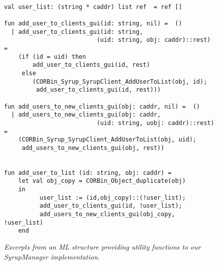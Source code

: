 \begin{figure*}[t]
\singlespace
\begin{verbatim}

val user_list: (string * caddr) list ref  = ref []

fun add_user_to_clients_gui(id: string, nil) =  ()
  | add_user_to_clients_gui(id: string, 
                          (uid: string, obj: caddr)::rest) =
    (if (id = uid) then
        add_user_to_clients_gui(id, rest)
     else
        (CORBin_Syrup_SyrupClient_AddUserToList(obj, id);
         add_user_to_clients_gui(id, rest)))

fun add_users_to_new_clients_gui(obj: caddr, nil) =  ()
  | add_users_to_new_clients_gui(obj: caddr,
                          (uid: string, uobj: caddr)::rest) =
    (CORBin_Syrup_SyrupClient_AddUserToList(obj, uid);
     add_users_to_new_clients_gui(obj, rest))


fun add_user_to_list (id: string, obj: caddr) =
    let val obj_copy = CORBin_Object_duplicate(obj)
    in
          user_list := (id,obj_copy)::(!user_list);
          add_user_to_clients_gui(id, !user_list);
          add_users_to_new_clients_gui(obj_copy, !user_list)
    end

\end{verbatim}
\doublespace
\caption {{\em Excerpts from an ML structure providing utility functions to our SyrupManager implementation}.}
\figline
        \label{SyrupManagerStructure}
\end{figure*}

